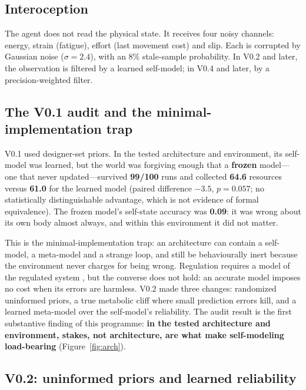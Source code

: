\documentclass[11pt,a4paper]{article}
\begin{document}
\subsection{Interoception}

The agent does not read the physical state. It receives four noisy channels: energy, strain (fatigue), effort (last movement cost) and slip. Each is corrupted by Gaussian noise ($\sigma=2.4$), with an 8\% stale-sample probability. In V0.2 and later, the observation is filtered by a learned self-model; in V0.4 and later, by a precision-weighted filter.

\subsection{The V0.1 audit and the minimal-implementation trap}

V0.1 used designer-set priors. In the tested architecture and environment, its self-model was learned, but the world was forgiving enough that a \textbf{frozen} model---one that never updated---survived \textbf{99/100} runs and collected \textbf{64.6} resources versus \textbf{61.0} for the learned model (paired difference $-3.5$, $p=0.057$; no statistically distinguishable advantage, which is not evidence of formal equivalence). The frozen model's self-state accuracy was \textbf{0.09}: it was wrong about its own body almost always, and within this environment it did not matter.

This is the minimal-implementation trap: an architecture can contain a self-model, a meta-model and a strange loop, and still be behaviourally inert because the environment never charges for being wrong. Regulation requires a model of the regulated system \citep{conant1970every}, but the converse does not hold: an accurate model imposes no cost when its errors are harmless. V0.2 made three changes: randomized uninformed priors, a true metabolic cliff where small prediction errors kill, and a learned meta-model over the self-model's reliability. The audit result is the first substantive finding of this programme: \textbf{in the tested architecture and environment, stakes, not architecture, are what make self-modeling load-bearing} (Figure~\ref{fig:arch}).

\subsection{V0.2: uninformed priors and learned reliability}
\end{document}
